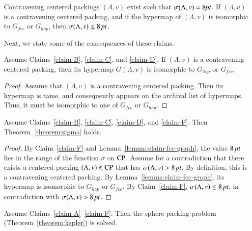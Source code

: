 
\begin{claim}\label{claim-F}
Contravening centered packings $(\Lambda,v)$ exist such that
$\sigma(\Lambda,v)=8\hbox{\it pt}$. If $(\Lambda,v)$ is a contravening centered packing, and
if the hypermap of $(\Lambda,v)$ is isomorphic to $G_{fcc}$ or $G_{hcp}$,
then $\sigma(\Lambda,v) \le 8\,\hbox{\it pt}$.
\end{claim} %

Next, we state some of the consequences of these claims.

\begin{lemma}\label{lemma:claim-fcc-graph}
Assume Claims~\ref{claim-B}, \ref{claim-C}, and \ref{claim-D}. If
$(\Lambda,v)$ is a contravening centered packing, then its hypermap $G(\Lambda,v)$
is isomorphic to $G_{hcp}$ or $G_{fcc}$.
\end{lemma}

\begin{proof} Assume that $(\Lambda,v)$ is a contravening centered packing.  Then its hypermap is tame, and consequently appears on the
archival list of hypermaps.  Thus, it must be isomorphic to one of
$G_{fcc}$ or $G_{hcp}$.
\end{proof}

\begin{lemma}\label{lemma:claim-sigma}
Assume Claims~\ref{claim-B}, \ref{claim-C}, \ref{claim-D}, and
\ref{claim-F}. Then Theorem~\ref{theorem:sigma} holds.
\end{lemma}

\begin{proof}
By Claim~\ref{claim-F} and Lemma~\ref{lemma:claim-fcc-graph}, the
value $8\,\hbox{\it pt}$ lies in the range of the function $\sigma$ on
${\operatorname{CP}}$.   Assume for a contradiction that there exists a
centered packing $(\Lambda,v)\in {\operatorname{CP}}$ that has $\sigma(\Lambda,v)>8\,\hbox{\it pt}$. By
definition, this is a contravening centered packing. By
Lemma~\ref{lemma:claim-fcc-graph}, its hypermap is isomorphic to
$G_{hcp}$ or $G_{fcc}$.  By Claim~\ref{claim-F}, $\sigma(\Lambda,v)\le
8\,\hbox{\it pt}$, in contradiction with $\sigma(\Lambda,v)>8\,\hbox{\it pt}$.
\end{proof}


\begin{lemma}
Assume Claims~\ref{claim-A}--\ref{claim-F}. Then the sphere packing problem
(Theorem~\ref{theorem:kepler}) is solved.
\end{lemma}

